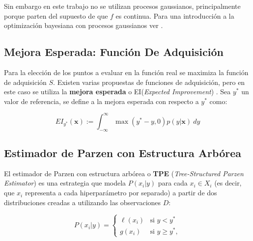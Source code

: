 Sin embargo en este trabajo no se utilizan procesos gaussianos, principalmente porque parten del supuesto de que $f$ es continua. Para una introducción a la optimización bayesiana con procesos gaussianos ver \cite{https://doi.org/10.48550/arxiv.1012.2599}.

\subsection{Mejora Esperada: Función De Adquisición} 
 
Para la elección de los puntos a evaluar en la función real se maximiza la función de adquisición $S$. Existen varias propuestas de funciones de adquisición, pero en este caso se utiliza la \textbf{mejora esperada} o EI(\textit{Expected Improvement}) \cite{EI1}. Sea $y^*$ un valor de referencia, se define a la mejora esperada  con respecto a $y^*$ como:


\begin{equation}
\label{eq:ei_def}
EI_{y^*}(\textbf{x}) := \int_{-\infty}^{\infty} \max(y^*-y,0) p(y|\textbf{x}) \ dy
\end{equation}
 

\subsection{Estimador de Parzen con Estructura Arbórea} 

 El estimador de Parzen con estructura arbórea o \textbf{TPE} (\textit{Tree-Structured Parzen Estimator}) \cite{NIPS2011_86e8f7ab} es una estrategia que modela $P(x_i|y)$ para cada $x_i \in X_i$ (es decir, que $x_i$ representa a cada hiperparámetro por separado) a partir de dos distribuciones creadas a utilizando las observaciones $D$:

\begin{equation}
\label{eq:tpe}
P(x_i|y) =
	\begin{cases}
		\ell (x_i) & \text{si } y <y^{*} \\
		g(x_i) & \text{si } y \geq y^{*},
	\end{cases}
\end{equation}


